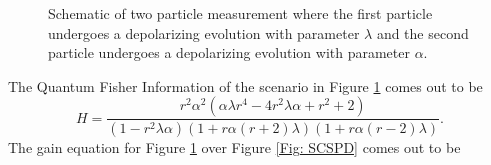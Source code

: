 \documentclass[twocolumn]{article}
\begin{document}
\begin{figure}[ht]
    \caption{\footnotesize{Schematic of two particle measurement where the first particle undergoes a depolarizing evolution with parameter $\lambda$ and the second particle undergoes a depolarizing evolution with parameter $\alpha$.}}
    \label{Fig: DCPAL}
\end{figure}
\par \noindent
The Quantum Fisher Information of the scenario in Figure \ref{Fig: DCPAL} comes out to be
\begin{equation}\label{Eq: DCPALQFI}
H=\frac{r^2\alpha^2(\alpha\lambda r^4-4r^2\lambda\alpha+r^2+2)}{(1-r^2\lambda\alpha)(1+r\alpha(r+2)\lambda)(1+r\alpha(r-2)\lambda)}.
\end{equation}
The gain equation for Figure \ref{Fig: DCPAL} over Figure \ref{Fig: SCSPD} comes out to be
\end{document}
